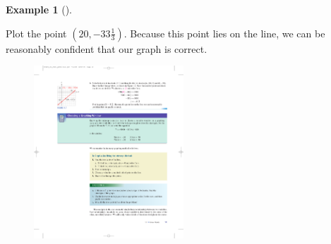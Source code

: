 \documentclass[10pt,]{book}
\theoremstyle{plain}
\theoremstyle{definition}
\theoremstyle{definition}
\newtheorem{example}[theorem]{Example}
\theoremstyle{definition}
\theoremstyle{definition}
\numberwithin{equation}{section}
\begin{document}
\begin{example}[]
\begin{enumerate}[label=*\alph**]
            Plot the point \((20, −33\frac{1}{3})\). Because this point lies on the line, we can be reasonably confident that our graph is correct. 
            \leavevmode%
\begin{figure}
\centering
\includegraphics[width=0.50\textwidth,]{images/fig-example-graph-intercepts.pdf}\caption{\label{fig-example-graph-intercepts}}
\end{figure}

\end{enumerate}
\end{example}
\end{document}
